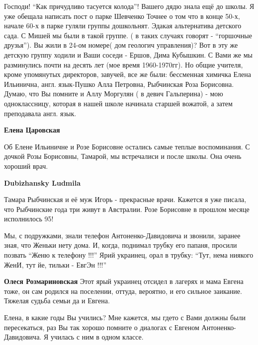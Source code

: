 \begin{itemize}
\begin{itemize}
\begin{itemize}
Господи! \enquote{Как причудливо тасуется колода}! Вашего дядю знала ещё до школы. Я
уже обещала написать пост о парке Шевченко Точнее о том что в конце 50-х,
начале 60-х в парке гуляли группы дошкольнят. Эдакая альтернатива детского
сада. С Мишей мы были в такой группе. ( в таких случаях говорят - \enquote{горшочные
друзья}). Вы жили в 24-ом номере( дом геологич управления)? Вот в эту же
детскую группу ходили и Ваши соседи - Ершов, Дима Кубышкин. С Вами же мы
разминулись почти на десять лет (мое время 1960-1970гг). Но общие учителя, кроме
упомянутых директоров, завучей, все же были: бессменная химичка Елена Ильинична,
англ. язык-Пушко Алла Петровна, Рыбчинская Роза Борисовна. Думаю, что Вы помните и
Аллу Моргулян ( в девич Гальперина) - мою одноклассницу, которая в нашей школе
начинала старшей вожатой, а затем преподавала англ. язык.

\textbf{Елена Царовская} 

Об Елене Ильиничне и Розе Борисовне остались самые теплые воспоминания. С
дочкой Розы Борисовны, Тамарой, мы встречалиси и после школы. Она очень хороший
врач.

\textbf{Dubizhansky Ludmila} 

Тамара Рыбчинская и её муж Игорь - прекрасные врачи. Кажется я уже писала, что
Рыбчинские года три живут в Австралии. Розе Борисовне в прошлом месяце
исполнилось 95!

\end{itemize} %


Мы, с подружками, знали телефон Антоненко-Давидовича и звонили, заранее зная, что
Женьки нету дома. И, когда, поднимал трубку его папаня, просили позвать \enquote{Женю к
телефону !!!} Ярий украинец, орал в трубку: \enquote{Тут, нема ниякого ЖенИ, тут йе, тильки
- ЕвгЭн !!!}

\begin{itemize} %
\textbf{Олеся Розмариновская} Этот ярый украинец отсидел в лагерях и мама Евгена тоже, он сам родился на поселении, оттуда, вероятно, и его сильное заикание. Тяжелая судьба семьи да и Евгена.
\end{itemize} %


Елена, в какие годы Вы учились? Мне кажется, мы гдето с Вами должны были
пересекаться, раз Вы так хорошо помните о диалогах с Евгеном
Антоненко-Давидовича. Я училась с ним в одном классе.


\end{itemize}
\end{itemize}
